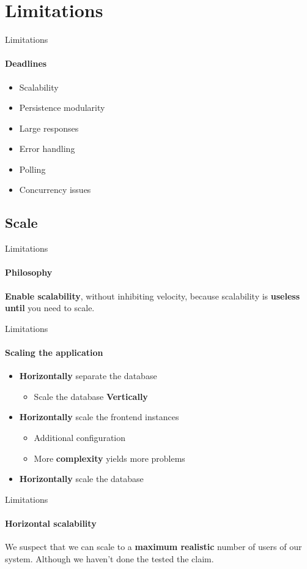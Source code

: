 \section{Limitations}

\begin{frame}{Limitations}
	\framesubtitle{Deadlines}
	\begin{itemize}
		\item{Scalability}
		\item{Persistence modularity}
		\item{Large responses}
		\item{Error handling}
		\item{Polling}
		\item{Concurrency issues}
	\end{itemize}
\end{frame}

\subsection{Scale}

\begin{frame}{Limitations}
	\framesubtitle{Philosophy}
	\textbf{Enable scalability}, without inhibiting velocity,
	because scalability is \textbf{useless until} you need to scale.
\end{frame}

\begin{frame}{Limitations}
	\framesubtitle{Scaling the application}
	\begin{itemize}
		\item\textbf{Horizontally} separate the database
			\begin{itemize}
				\item Scale the database \textbf{Vertically}
			\end{itemize}
		\item \textbf{Horizontally} scale the frontend instances
			\begin{itemize}
				\item Additional configuration
				\item More \textbf{complexity} yields more problems
			\end{itemize}
		\item \textbf{Horizontally} scale the database
	\end{itemize}
\end{frame}

\begin{frame}{Limitations}
	\framesubtitle{Horizontal scalability}
	We suspect that we can scale to a \textbf{maximum realistic} number of users of our system. Although we haven't done the tested the claim.
\end{frame}

